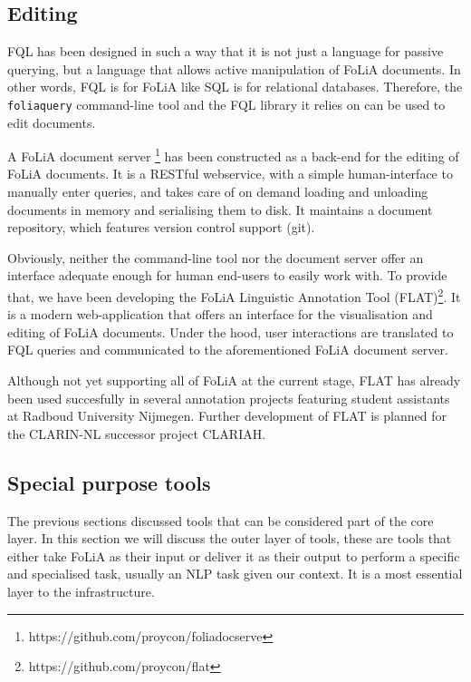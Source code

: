 \subsection{Editing}

FQL has been designed in such a way that it is not just a language for
passive querying, but a language that allows active manipulation of FoLiA
documents. In other words, FQL is for FoLiA like SQL is for relational
databases. Therefore, the \texttt{foliaquery} command-line tool and the FQL
library it relies on can be used to edit documents. 

A FoLiA document server \footnote{https://github.com/proycon/foliadocserve} has
been constructed as a back-end for the editing of FoLiA documents. It is a
RESTful webservice, with a simple human-interface to manually enter queries,
and takes care of on demand loading and unloading documents in memory and
serialising them to disk. It maintains a document repository, which features
version control support (git).

Obviously, neither the command-line tool nor the document server offer an
interface adequate enough for human end-users to easily work with. To provide
that, we have been developing the FoLiA Linguistic Annotation Tool
(FLAT)\footnote{https://github.com/proycon/flat}. It is a modern
web-application that offers an interface for the visualisation and editing of
FoLiA documents. Under the hood, user interactions are translated to FQL
queries and communicated to the aforementioned FoLiA document server.

Although not yet supporting all of FoLiA at the current stage, FLAT has already
been used succesfully in several annotation projects featuring student
assistants at Radboud University Nijmegen. Further development of FLAT is
planned for the CLARIN-NL successor project CLARIAH.

\subsection{Special purpose tools}

The previous sections discussed tools that can be considered part of the
core layer. In this section we will discuss the outer layer of tools, these are
tools that either take FoLiA as their input or deliver it as their output to
perform a specific and specialised task, usually an NLP task given our context.
It is a most essential layer to the infrastructure.

